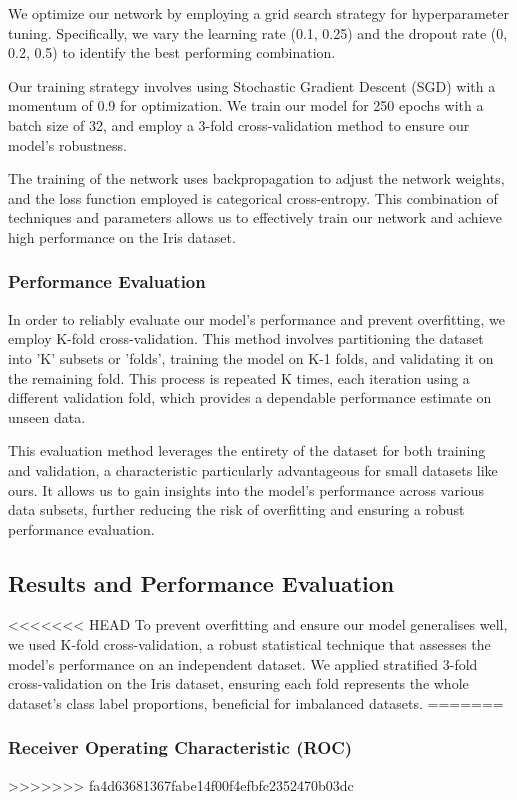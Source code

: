 \documentclass[conference]{inc/IEEEtran}
\begin{document}
We optimize our network by employing a grid search strategy for hyperparameter tuning. Specifically, we vary the learning rate (0.1, 0.25) and the dropout rate (0, 0.2, 0.5) to identify the best performing combination.

Our training strategy involves using Stochastic Gradient Descent (SGD) with a momentum of 0.9 for optimization. We train our model for 250 epochs with a batch size of 32, and employ a 3-fold cross-validation method to ensure our model's robustness.

The training of the network uses backpropagation to adjust the network weights, and the loss function employed is categorical cross-entropy. This combination of techniques and parameters allows us to effectively train our network and achieve high performance on the Iris dataset.

\subsubsection{Performance Evaluation}

In order to reliably evaluate our model's performance and prevent overfitting, we employ K-fold cross-validation. This method involves partitioning the dataset into 'K' subsets or 'folds', training the model on K-1 folds, and validating it on the remaining fold. This process is repeated K times, each iteration using a different validation fold, which provides a dependable performance estimate on unseen data.

This evaluation method leverages the entirety of the dataset for both training and validation, a characteristic particularly advantageous for small datasets like ours. It allows us to gain insights into the model's performance across various data subsets, further reducing the risk of overfitting and ensuring a robust performance evaluation.

\subsection{Results and Performance Evaluation}

<<<<<<< HEAD
To prevent overfitting and ensure our model generalises well, we used K-fold cross-validation, a robust statistical technique that assesses the model's performance on an independent dataset. We applied stratified 3-fold cross-validation on the Iris dataset, ensuring each fold represents the whole dataset's class label proportions, beneficial for imbalanced datasets.
=======
\subsubsection{Receiver Operating Characteristic (ROC)}
>>>>>>> fa4d63681367fabe14f00f4efbfc2352470b03dc
\end{document}
